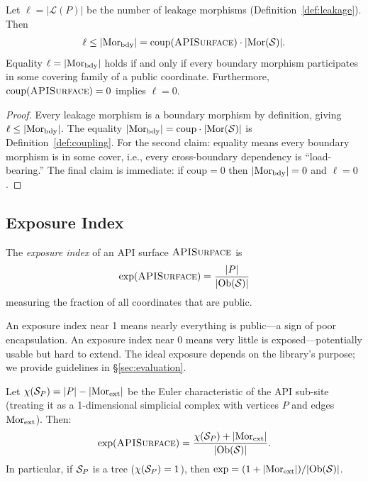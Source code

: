 \documentclass[11pt]{article}
\newcommand{\APISurface}{\textsc{APISurface}}
\newcommand{\CoupIndex}{\mathrm{coup}}
\newcommand{\ExpIndex}{\mathrm{exp}}
\begin{document}
\begin{theorem}\label{thm:coup-leak}
Let $\ell = |\mathcal{L}(P)|$ be the number of leakage morphisms
(Definition~\ref{def:leakage}).  Then
\[
  \ell \leq |\Mor_{\mathrm{bdy}}| = \CoupIndex(\APISurface) \cdot |\Mor(\Site)|.
\]
Equality $\ell = |\mathrm{Mor}_{\mathrm{bdy}}|$ holds if and only if every boundary
morphism participates in some covering family of a public coordinate.
Furthermore, $\CoupIndex(\APISurface) = 0$ implies $\ell = 0$.
\end{theorem}

\begin{proof}
Every leakage morphism is a boundary morphism by definition, giving
$\ell \leq |\mathrm{Mor}_{\mathrm{bdy}}|$.  The equality
$|\Mor_{\mathrm{bdy}}| = \CoupIndex \cdot |\Mor(\Site)|$ is
Definition~\ref{def:coupling}.  For the second claim: equality means
every boundary morphism is in some cover, i.e., every cross-boundary
dependency is ``load-bearing.''  The final claim is immediate: if
$\CoupIndex = 0$ then $|\mathrm{Mor}_{\mathrm{bdy}}| = 0$ and $\ell = 0$.
\end{proof}

\subsection{Exposure Index}

\begin{definition}\label{def:exposure}
The \emph{exposure index} of an API surface $\APISurface$ is
\[
  \ExpIndex(\APISurface) = \frac{|P|}{|\Ob(\Site)|}
\]
measuring the fraction of all coordinates that are public.
\end{definition}

An exposure index near 1 means nearly everything is public---a sign of
poor encapsulation.  An exposure index near 0 means very little is
exposed---potentially usable but hard to extend.  The ideal exposure
depends on the library's purpose; we provide guidelines in
§\ref{sec:evaluation}.

\begin{lemma}\label{lem:exposure-euler}
Let $\chi(\mathcal{S}_P) = |P| - |\mathrm{Mor}_{\mathrm{ext}}|$ be the Euler
characteristic of the API sub-site (treating it as a 1-dimensional
simplicial complex with vertices $P$ and edges $\mathrm{Mor}_{\mathrm{ext}}$).
Then:
\[
  \ExpIndex(\APISurface) = \frac{\chi(\Site_P) + |\Mor_{\mathrm{ext}}|}{|\Ob(\Site)|}.
\]
In particular, if $\mathcal{S}_P$ is a tree ($\chi(\mathcal{S}_P) = 1$), then
$\ExpIndex = (1 + |\Mor_{\mathrm{ext}}|)/|\Ob(\Site)|$.
\end{lemma}
\end{document}
